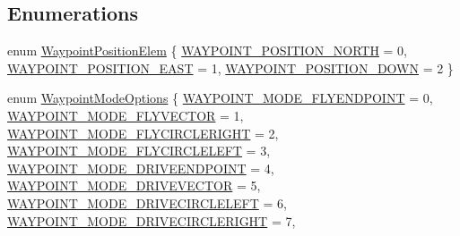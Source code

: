 \subsection*{\-Enumerations}
\begin{DoxyCompactItemize}
\item 
enum \hyperlink{group___waypoint_gaf54da803a9642182e5e0dfe2c5334b39}{\-Waypoint\-Position\-Elem} \{ \hyperlink{group___waypoint_ggaf54da803a9642182e5e0dfe2c5334b39a5a69b3974cbf72a62ead6acfe5bb5a42}{\-W\-A\-Y\-P\-O\-I\-N\-T\-\_\-\-P\-O\-S\-I\-T\-I\-O\-N\-\_\-\-N\-O\-R\-T\-H} = 0, 
\hyperlink{group___waypoint_ggaf54da803a9642182e5e0dfe2c5334b39a9c340c158b90adcec5985e184dea7ec1}{\-W\-A\-Y\-P\-O\-I\-N\-T\-\_\-\-P\-O\-S\-I\-T\-I\-O\-N\-\_\-\-E\-A\-S\-T} = 1, 
\hyperlink{group___waypoint_ggaf54da803a9642182e5e0dfe2c5334b39ad4b12a4867839d307cbd9ee7fbbfd95b}{\-W\-A\-Y\-P\-O\-I\-N\-T\-\_\-\-P\-O\-S\-I\-T\-I\-O\-N\-\_\-\-D\-O\-W\-N} = 2
 \}
\item 
enum \hyperlink{group___waypoint_ga92add8f5ed5a31b0704117917e3bacbd}{\-Waypoint\-Mode\-Options} \{ \*
\hyperlink{group___waypoint_gga92add8f5ed5a31b0704117917e3bacbdaf1c3c4aadd4c381e8c6602728c204621}{\-W\-A\-Y\-P\-O\-I\-N\-T\-\_\-\-M\-O\-D\-E\-\_\-\-F\-L\-Y\-E\-N\-D\-P\-O\-I\-N\-T} = 0, 
\hyperlink{group___waypoint_gga92add8f5ed5a31b0704117917e3bacbda716c9134910ad499d0f4fdac945dca32}{\-W\-A\-Y\-P\-O\-I\-N\-T\-\_\-\-M\-O\-D\-E\-\_\-\-F\-L\-Y\-V\-E\-C\-T\-O\-R} = 1, 
\hyperlink{group___waypoint_gga92add8f5ed5a31b0704117917e3bacbdaa49efb38a3278ae54ab81dbed64684b3}{\-W\-A\-Y\-P\-O\-I\-N\-T\-\_\-\-M\-O\-D\-E\-\_\-\-F\-L\-Y\-C\-I\-R\-C\-L\-E\-R\-I\-G\-H\-T} = 2, 
\hyperlink{group___waypoint_gga92add8f5ed5a31b0704117917e3bacbda645d76d4a4dc4c3251317d2482fa4b6a}{\-W\-A\-Y\-P\-O\-I\-N\-T\-\_\-\-M\-O\-D\-E\-\_\-\-F\-L\-Y\-C\-I\-R\-C\-L\-E\-L\-E\-F\-T} = 3, 
\*
\hyperlink{group___waypoint_gga92add8f5ed5a31b0704117917e3bacbdaa0d3d4c371dc71b869f9f190e1444318}{\-W\-A\-Y\-P\-O\-I\-N\-T\-\_\-\-M\-O\-D\-E\-\_\-\-D\-R\-I\-V\-E\-E\-N\-D\-P\-O\-I\-N\-T} = 4, 
\hyperlink{group___waypoint_gga92add8f5ed5a31b0704117917e3bacbdac5c149221ec50994d51f07a2f5a9f749}{\-W\-A\-Y\-P\-O\-I\-N\-T\-\_\-\-M\-O\-D\-E\-\_\-\-D\-R\-I\-V\-E\-V\-E\-C\-T\-O\-R} = 5, 
\hyperlink{group___waypoint_gga92add8f5ed5a31b0704117917e3bacbdaf7c4e8187cdb00430a030f623ab9467f}{\-W\-A\-Y\-P\-O\-I\-N\-T\-\_\-\-M\-O\-D\-E\-\_\-\-D\-R\-I\-V\-E\-C\-I\-R\-C\-L\-E\-L\-E\-F\-T} = 6, 
\hyperlink{group___waypoint_gga92add8f5ed5a31b0704117917e3bacbdab21220a05d382211a214357ad7202a0c}{\-W\-A\-Y\-P\-O\-I\-N\-T\-\_\-\-M\-O\-D\-E\-\_\-\-D\-R\-I\-V\-E\-C\-I\-R\-C\-L\-E\-R\-I\-G\-H\-T} = 7, 

\end{DoxyCompactItemize}
